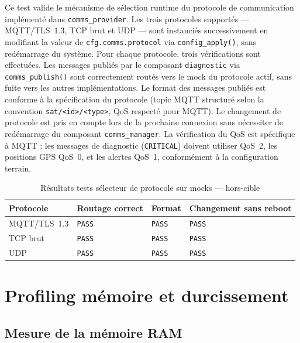 Ce test valide le mécanisme de sélection runtime du protocole de
communication implémenté dans \texttt{comms\_provider}. Les trois
protocoles supportés — MQTT/TLS~1.3, TCP brut et UDP — sont instanciés
successivement en modifiant la valeur de \texttt{cfg.comms.protocol}
via \texttt{config\_apply()}, sans redémarrage du système. Pour chaque
protocole, trois vérifications sont effectuées. Les messages publiés
par le composant \texttt{diagnostic} via \texttt{comms\_publish()}
sont correctement routés vers le mock du protocole actif, sans fuite
vers les autres implémentations. Le format des messages publiés est
conforme à la spécification du protocole (topic MQTT structuré selon
la convention \texttt{sat/<id>/<type>}, QoS respecté pour MQTT). Le
changement de protocole est pris en compte lors de la prochaine
connexion sans nécessiter de redémarrage du composant
\texttt{comms\_manager}. La vérification du QoS est spécifique à MQTT :
les messages de diagnostic (\texttt{CRITICAL}) doivent utiliser
QoS~2, les positions GPS QoS~0, et les alertes QoS~1, conformément
à la configuration terrain.

\begin{table}[H]
\centering
\renewcommand{\arraystretch}{1.5}
\caption{Résultats tests sélecteur de protocole sur mocks — hors-cible}
\label{tab:res_proto}
\small
\begin{tabular}{|p{3.5cm}|p{2.8cm}|p{2.0cm}|p{3.0cm}|}
\hline
\rowcolor{gray!20}
\textbf{Protocole} & \textbf{Routage correct} & \textbf{Format} & \textbf{Changement sans reboot} \\
\hline
MQTT/TLS~1.3 & \texttt{PASS} & \texttt{PASS} & \texttt{PASS} \\
\hline
TCP brut      & \texttt{PASS} & \texttt{PASS} & \texttt{PASS} \\
\hline
UDP           & \texttt{PASS} & \texttt{PASS} & \texttt{PASS} \\
\hline
\end{tabular}
\end{table}

\section{Profiling mémoire et durcissement}
\label{sec:profiling}

\subsection{Mesure de la mémoire RAM}
\label{subsec:ram}

